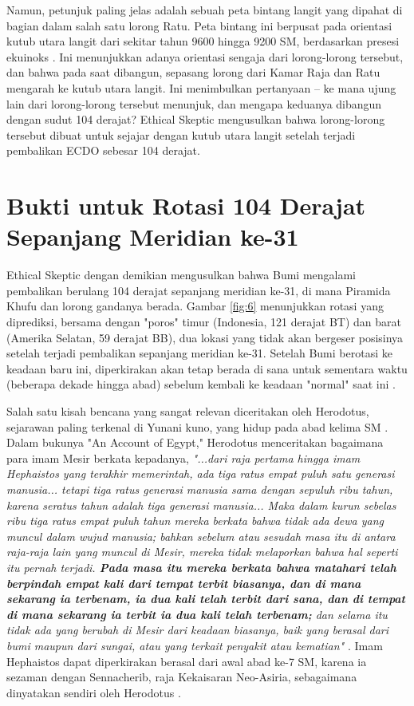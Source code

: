 \documentclass[10pt,twocolumn,letterpaper]{article}
\begin{document}
Namun, petunjuk paling jelas adalah sebuah peta bintang langit yang dipahat di bagian dalam salah satu lorong Ratu. Peta bintang ini berpusat pada orientasi kutub utara langit dari sekitar tahun 9600 hingga 9200 SM, berdasarkan presesi ekuinoks \cite{28}. Ini menunjukkan adanya orientasi sengaja dari lorong-lorong tersebut, dan bahwa pada saat dibangun, sepasang lorong dari Kamar Raja dan Ratu mengarah ke kutub utara langit. Ini menimbulkan pertanyaan – ke mana ujung lain dari lorong-lorong tersebut menunjuk, dan mengapa keduanya dibangun dengan sudut 104 derajat? Ethical Skeptic mengusulkan bahwa lorong-lorong tersebut dibuat untuk sejajar dengan kutub utara langit setelah terjadi pembalikan ECDO sebesar 104 derajat.

\section{Bukti untuk Rotasi 104 Derajat Sepanjang Meridian ke-31}

Ethical Skeptic dengan demikian mengusulkan bahwa Bumi mengalami pembalikan berulang 104 derajat sepanjang meridian ke-31, di mana Piramida Khufu dan lorong gandanya berada. Gambar \ref{fig:6} menunjukkan rotasi yang diprediksi, bersama dengan "poros" timur (Indonesia, 121 derajat BT) dan barat (Amerika Selatan, 59 derajat BB), dua lokasi yang tidak akan bergeser posisinya setelah terjadi pembalikan sepanjang meridian ke-31. Setelah Bumi berotasi ke keadaan baru ini, diperkirakan akan tetap berada di sana untuk sementara waktu (beberapa dekade hingga abad) sebelum kembali ke keadaan "normal" saat ini \cite{150}.

Salah satu kisah bencana yang sangat relevan diceritakan oleh Herodotus, sejarawan paling terkenal di Yunani kuno, yang hidup pada abad kelima SM \cite{31}. Dalam bukunya "An Account of Egypt," Herodotus menceritakan bagaimana para imam Mesir berkata kepadanya, \textit{"...dari raja pertama hingga imam Hephaistos yang terakhir memerintah, ada tiga ratus empat puluh satu generasi manusia... tetapi tiga ratus generasi manusia sama dengan sepuluh ribu tahun, karena seratus tahun adalah tiga generasi manusia... Maka dalam kurun sebelas ribu tiga ratus empat puluh tahun mereka berkata bahwa tidak ada dewa yang muncul dalam wujud manusia; bahkan sebelum atau sesudah masa itu di antara raja-raja lain yang muncul di Mesir, mereka tidak melaporkan bahwa hal seperti itu pernah terjadi. \textbf{Pada masa itu mereka berkata bahwa matahari telah berpindah empat kali dari tempat terbit biasanya, dan di mana sekarang ia terbenam, ia dua kali telah terbit dari sana, dan di tempat di mana sekarang ia terbit ia dua kali telah terbenam;} dan selama itu tidak ada yang berubah di Mesir dari keadaan biasanya, baik yang berasal dari bumi maupun dari sungai, atau yang terkait penyakit atau kematian"} \cite{32}. Imam Hephaistos dapat diperkirakan berasal dari awal abad ke-7 SM, karena ia sezaman dengan Sennacherib, raja Kekaisaran Neo-Asiria, sebagaimana dinyatakan sendiri oleh Herodotus \cite{32,33,34}.
\end{document}
